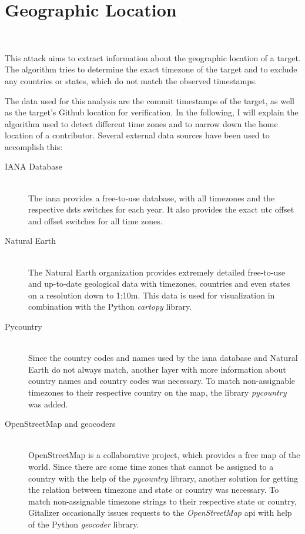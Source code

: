 \section{Geographic Location}~\label{timezone-implementation}

This attack aims to extract information about the geographic location of a target.
The algorithm tries to determine the exact timezone of the target and to exclude any countries or states, which do not match the observed timestamps.

The data used for this analysis are the commit timestamps of the target, as well as the target's Github location for verification.
In the following, I will explain the algorithm used to detect different time zones and to narrow down the home location of a contributor.
Several external data sources have been used to accomplish this:

\begin{description}
    \item[IANA Database] \hfill \\
    The \ac{iana} provides a free-to-use database, with all timezones and the respective \acp{dst} switches for each year.
    It also provides the exact \ac{utc} offset and offset switches for all time zones.

    \item[Natural Earth] \hfill \\
    The Natural Earth organization provides extremely detailed free-to-use and up-to-date geological data with timezones, countries and even states on a resolution down to 1:10m.
    This data is used for visualization in combination with the Python \emph{cartopy} library.

    \item[Pycountry] \hfill \\
    Since the country codes and names used by the \ac{iana} database and Natural Earth do not always match, another layer with more information about country names and country codes was necessary.
    To match non-assignable timezones to their respective country on the map, the library \emph{pycountry} was added.

    \item[OpenStreetMap and geocoders] \hfill \\
    OpenStreetMap is a collaborative project, which provides a free map of the world.
    Since there are some time zones that cannot be assigned to a country with the help of the \emph{pycountry} library, another solution for getting the relation between timezone and state or country was necessary.
    To match non-assignable timezone strings to their respective state or country, Gitalizer occasionally issues requests to the \emph{OpenStreetMap} \ac{api} with help of the Python \emph{geocoder} library.

\end{description}

